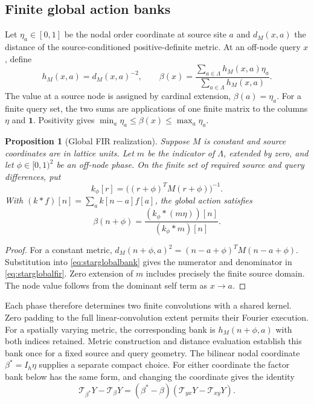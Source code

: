 \documentclass[journal]{IEEEtran}
\newtheorem{proposition}{Proposition}
\begin{document}
\subsection{Finite global action banks}
Let $\eta_a\in[0,1]$ be the nodal order coordinate at source site $a$ and
$d_M(x,a)$ the distance of the source-conditioned positive-definite metric.
At an off-node query $x$, define
\begin{equation}
 h_M(x,a)=d_M(x,a)^{-2},\qquad
 \beta(x)=\frac{\sum_{a\in\Lambda}h_M(x,a)\eta_a}
 {\sum_{a\in\Lambda}h_M(x,a)}.
 \label{eq:starglobalbank}
\end{equation}
The value at a source node is assigned by cardinal extension,
$\beta(a)=\eta_a$. For a finite query set, the two sums are applications of
one finite matrix to the columns $\eta$ and $\mathbf1$. Positivity gives
$\min_a\eta_a\leq\beta(x)\leq\max_a\eta_a$.

\begin{proposition}[Global FIR realization]
Suppose $M$ is constant and source coordinates are in lattice units. Let
$m$ be the indicator of $\Lambda$, extended by zero, and let
$\phi\in[0,1)^2$ be an off-node phase. On the finite set of required source
and query differences, put
\begin{equation}
 k_\phi[r]=\bigl((r+\phi)^TM(r+\phi)\bigr)^{-1}.
\end{equation}
With $(k*f)[n]=\sum_a k[n-a]f[a]$, the global action satisfies
\begin{equation}
 \beta(n+\phi)=\frac{(k_\phi*(m\eta))[n]}{(k_\phi*m)[n]}.
 \label{eq:starglobalfir}
\end{equation}
\end{proposition}
\begin{proof}
For a constant metric, $d_M(n+\phi,a)^2=(n-a+\phi)^TM(n-a+\phi)$.
Substitution into \eqref{eq:starglobalbank} gives the numerator and denominator
in \eqref{eq:starglobalfir}. Zero extension of $m$ includes precisely the
finite source domain. The node value follows from the dominant self term as
$x\to a$.
\end{proof}

Each phase therefore determines two finite convolutions with a shared kernel.
Zero padding to the full linear-convolution extent permits their Fourier
execution. For a spatially varying metric, the corresponding bank is
$h_M(n+\phi,a)$ with both indices retained. Metric construction and distance
evaluation establish this bank once for a fixed source and query geometry.
The bilinear nodal coordinate $\beta^*=I_h\eta$ supplies a separate compact
choice. For either coordinate the factor bank below has the same form, and
changing the coordinate gives the identity
\begin{equation}
 \mathcal T_{\beta^*}Y-\mathcal T_\beta Y
 =(\beta^*-\beta)(\mathcal T_{yx}Y-\mathcal T_{xy}Y).
\end{equation}
\end{document}
